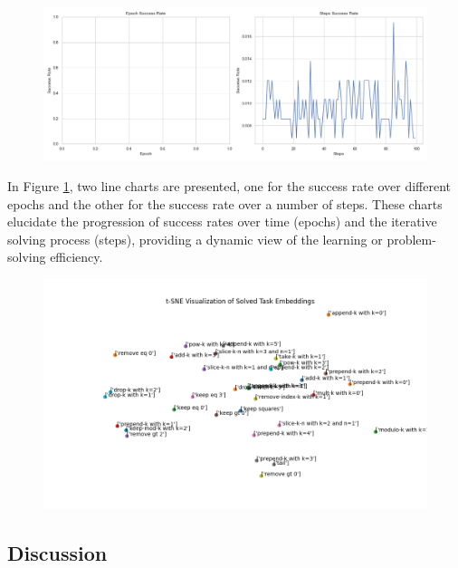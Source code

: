 \begin{figure}
    \centering
    \includegraphics[width=\textwidth]{../img/plot_epoch_steps_analysis.png}
    \caption{}
    \label{fig:epoch_steps_analysis}
\end{figure}

In Figure \ref{fig:epoch_steps_analysis}, two line charts are presented, one for the success rate over different epochs and the other for the success rate over a number of steps. These charts elucidate the progression of success rates over time (epochs) and the iterative solving process (steps), providing a dynamic view of the learning or problem-solving efficiency.

\begin{figure}
    \centering
    \includegraphics[width=\textwidth]{../img/task_embeddings.png}
    \caption{}
    \label{}
\end{figure}




    







\subsection{Discussion}

